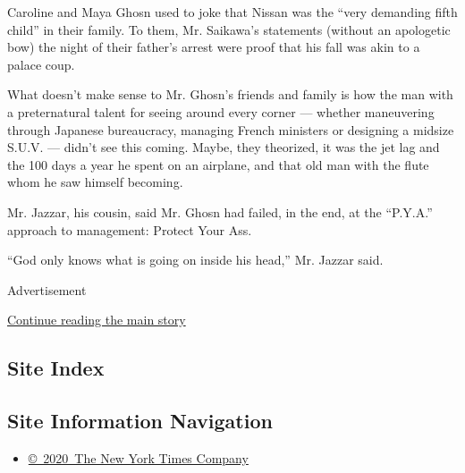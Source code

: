 Caroline and Maya Ghosn used to joke that Nissan was the ``very
demanding fifth child'' in their family. To them, Mr. Saikawa's
statements (without an apologetic bow) the night of their father's
arrest were proof that his fall was akin to a palace coup.

What doesn't make sense to Mr. Ghosn's friends and family is how the man
with a preternatural talent for seeing around every corner --- whether
maneuvering through Japanese bureaucracy, managing French ministers or
designing a midsize S.U.V. --- didn't see this coming. Maybe, they
theorized, it was the jet lag and the 100 days a year he spent on an
airplane, and that old man with the flute whom he saw himself becoming.

Mr. Jazzar, his cousin, said Mr. Ghosn had failed, in the end, at the
``P.Y.A.'' approach to management: Protect Your Ass.

``God only knows what is going on inside his head,'' Mr. Jazzar said.

Advertisement

\protect\hyperlink{after-bottom}{Continue reading the main story}

\hypertarget{site-index}{%
\subsection{Site Index}\label{site-index}}

\hypertarget{site-information-navigation}{%
\subsection{Site Information
Navigation}\label{site-information-navigation}}

\begin{itemize}
\tightlist
\item
  \href{https://help.nytimes.com/hc/en-us/articles/115014792127-Copyright-notice}{©~2020~The
  New York Times Company}
\end{itemize}

